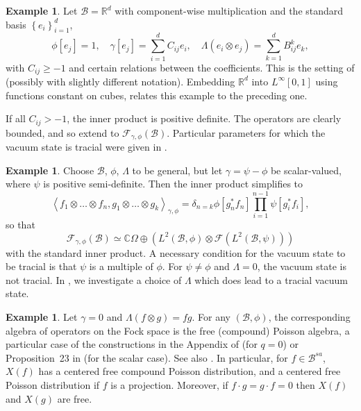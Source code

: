 \documentclass[12pt]{amsart}
\theoremstyle{definition}
\newtheorem{Example}[Thm]{Example}
\newcommand{\set}[1]{\left\{#1\right\}}
\newcommand{\mf}[1]{\mathbb{#1}}
\newcommand{\mc}[1]{\mathcal{#1}}
\newcommand{\ip}[2]{\left \langle{#1},{#2} \right \rangle}
\begin{document}
\begin{Example}
\label{Example:MA}
Let $\mc{B} = \mf{R}^d$ with component-wise multiplication and the standard basis $\set{e_i}_{i=1}^d$,
\[
\phi[e_j] = 1, \quad \gamma[e_j] = \sum_{i=1}^d C_{ij} e_i, \quad \Lambda(e_i \otimes e_j) = \sum_{k=1}^d B_{ij}^k e_k,
\]
with $C_{ij} \geq -1$ and certain relations between the coefficients. This is the setting of \cite{AnsFree-Meixner} (possibly with slightly different notation). Embedding $\mf{R}^d$ into $L^\infty[0,1]$ using functions constant on cubes, relates this example to the preceding one.


If all $C_{ij} > -1$, the inner product is positive definite. The operators are clearly bounded, and so extend to $\mc{F}_{\gamma, \phi}(\mc{B})$. Particular parameters for which the vacuum state is tracial were given in \cite{AnsFree-Meixner}.
\end{Example}


\begin{Example}
\label{Example:Scalar-gamma}
Choose $\mc{B}$, $\phi$, $\Lambda$ to be general, but let $\gamma = \psi - \phi$ be scalar-valued, where $\psi$ is positive semi-definite. Then the inner product simplifies to
\[
\ip{f_1 \otimes \ldots \otimes f_n}{g_1 \otimes \ldots \otimes g_k}_{\gamma,\phi}
= \delta_{n=k} \phi[g_n^\ast f_n] \prod_{i=1}^{n-1} \psi[g_i^\ast f_i],
\]
so that
\[
\mc{F}_{\gamma, \phi}(\mc{B}) \simeq \mf{C} \Omega \oplus \left( L^2(\mc{B}, \phi) \otimes \mc{F}(L^2(\mc{B}, \psi)) \right)
\]
with the standard inner product. A necessary condition for the vacuum state to be tracial is that $\psi$ is a multiple of $\phi$. For $\psi \neq \phi$ and $\Lambda = 0$, the vacuum state is not tracial. In \cite{Ans-Mashburn-Centered}, we investigate a choice of $\Lambda$ which does lead to a tracial vacuum state.
\end{Example}


\begin{Example}
\label{Example:Free-Poisson}
Let $\gamma = 0$ and $\Lambda(f \otimes g) = f g$. For any $(\mc{B}, \phi)$, the corresponding algebra of operators on the Fock space is the free (compound) Poisson algebra, a particular case of the constructions in the Appendix of \cite{AnsQLevy} (for $q = 0$) or Proposition~23 in \cite{Ans-Wick-products} (for the scalar case). See also \cite{GloSchurSpe}. In particular, for $f \in \mc{B}^{sa}$, $X(f)$ has a centered free compound Poisson distribution, and a centered free Poisson distribution if $f$ is a projection. Moreover, if $f \cdot g = g \cdot f = 0$ then $X(f)$ and $X(g)$ are free.
\end{Example}
\end{document}
